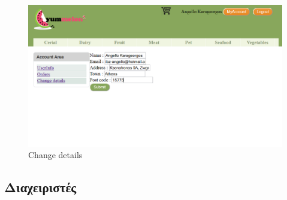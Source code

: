\documentclass[12pt]{article}
\begin{document}
			\begin{figure}[H]
				\centering
				\includegraphics[width=1\textwidth]{userChangeInfo}
				\caption{Change details}
			\end{figure}	  

	  \subsection{Διαχειριστές}
\end{document}
